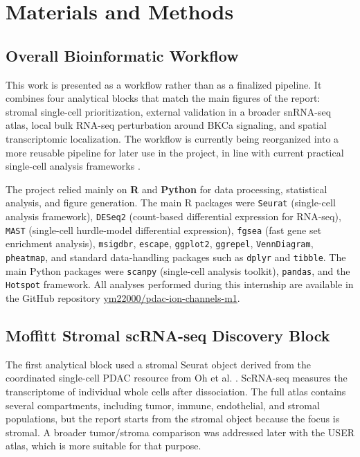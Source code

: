 \documentclass[11pt,a4paper]{article}
\begin{document}
\section{Materials and Methods}

\subsection{Overall Bioinformatic Workflow}
This work is presented as a workflow rather than as a finalized pipeline. It combines four analytical blocks that match the main figures of the report: stromal single-cell prioritization, external validation in a broader snRNA-seq atlas, local bulk RNA-seq perturbation around BKCa signaling, and spatial transcriptomic localization. The workflow is currently being reorganized into a more reusable pipeline for later use in the project, in line with current practical single-cell analysis frameworks \citep{luecken2019,he2022}.

The project relied mainly on \textbf{R} and \textbf{Python} for data processing, statistical analysis, and figure generation. The main R packages were \texttt{Seurat} (single-cell analysis framework), \texttt{DESeq2} (count-based differential expression for RNA-seq), \texttt{MAST} (single-cell hurdle-model differential expression), \texttt{fgsea} (fast gene set enrichment analysis), \texttt{msigdbr}, \texttt{escape}, \texttt{ggplot2}, \texttt{ggrepel}, \texttt{VennDiagram}, \texttt{pheatmap}, and standard data-handling packages such as \texttt{dplyr} and \texttt{tibble}. The main Python packages were \texttt{scanpy} (single-cell analysis toolkit), \texttt{pandas}, and the \texttt{Hotspot} framework. All analyses performed during this internship are available in the GitHub repository \href{https://github.com/ym22000/pdac-ion-channels-m1}{ym22000/pdac-ion-channels-m1}.

\subsection{Moffitt Stromal scRNA-seq Discovery Block}
The first analytical block used a stromal Seurat object derived from the coordinated single-cell PDAC resource from Oh et al. \citep{oh2023}. ScRNA-seq measures the transcriptome of individual whole cells after dissociation. The full atlas contains several compartments, including tumor, immune, endothelial, and stromal populations, but the report starts from the stromal object because the focus is stromal. A broader tumor/stroma comparison was addressed later with the USER atlas, which is more suitable for that purpose.
\end{document}
